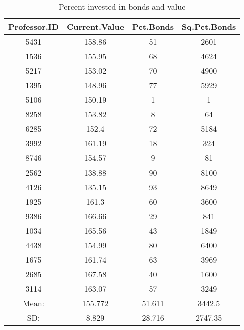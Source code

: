 \documentclass[11pt]{exam}
\begin{document}
\begin{questions}

\end{questions}

\ifprintanswers
\begin{center} \gradetable[v][questions] \end{center}
\fi

\newpage

\begin{table}[ht]
\begin{center}
\begin{tabular}{|c|c|c|c|}
  \hline
Professor.ID & Current.Value & Pct.Bonds & Sq.Pct.Bonds \\ 
  \hline
5431 & 158.86 & 51 & 2601 \\ 
   \hline
1536 & 155.95 & 68 & 4624 \\ 
   \hline
5217 & 153.02 & 70 & 4900 \\ 
   \hline
1395 & 148.96 & 77 & 5929 \\ 
   \hline
5106 & 150.19 & 1 & 1 \\ 
   \hline
8258 & 153.82 & 8 & 64 \\ 
   \hline
6285 & 152.4 & 72 & 5184 \\ 
   \hline
3992 & 161.19 & 18 & 324 \\ 
   \hline
8746 & 154.57 & 9 & 81 \\ 
   \hline
2562 & 138.88 & 90 & 8100 \\ 
   \hline
4126 & 135.15 & 93 & 8649 \\ 
   \hline
1925 & 161.3 & 60 & 3600 \\ 
   \hline
9386 & 166.66 & 29 & 841 \\ 
   \hline
1034 & 165.56 & 43 & 1849 \\ 
   \hline
4438 & 154.99 & 80 & 6400 \\ 
   \hline
1675 & 161.74 & 63 & 3969 \\ 
   \hline
2685 & 167.58 & 40 & 1600 \\ 
   \hline
3114 & 163.07 & 57 & 3249 \\ 
   \hline
\hline
Mean: & 155.772 & 51.611 & 3442.5 \\ 
   \hline
SD: & 8.829 & 28.716 & 2747.35 \\ 
   \hline
\end{tabular}
\caption{Percent invested in bonds and value}
\label{tab:401k}
\end{center}
\end{table}
\end{document}
